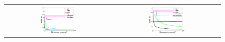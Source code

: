\documentclass[letterpaper]{article}
\newcommand{\nnn}{0.35}
\begin{document}


\begin{figure}[t!]
\vspace{-0mm}
\begin{center}
\begin{tabular}{cc}
   \hspace{-5mm} \includegraphics[width=\nnn\textwidth]{../plotsx/conductancex/err-vs-time__param10-shaded.pdf} 
& \hspace{-3mm} \includegraphics[width=\nnn\textwidth]{../plotsx/conductancex/err-vs-time__param30-shaded.pdf} 

\end{tabular}
\end{center}
\end{figure}
\end{document}

